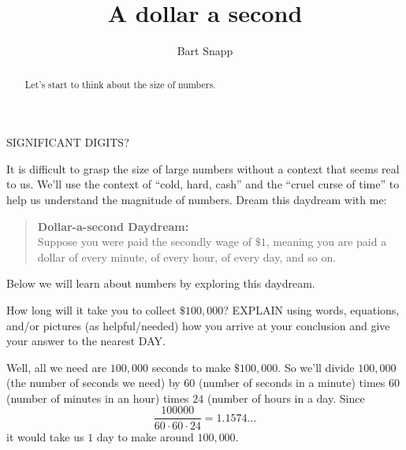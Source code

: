 \documentclass[nooutcomes,noauthor,hints]{ximera}
\title{A dollar a second}
\author{Bart Snapp}
\begin{document}
\begin{abstract}
  Let's start to think about the size of numbers.
\end{abstract}
\maketitle

\begin{listOutcomes}
\item SIGNIFICANT DIGITS?
\end{listOutcomes}


It is difficult to grasp the size of large numbers without a context
that seems real to us. We'll use the context of ``cold, hard, cash''
and the ``cruel curse of time'' to help us understand the magnitude of
numbers.  Dream this daydream with me:
\begin{mdframed}[style=OutcomeStyle]
  \begin{quote}
    \textbf{Dollar-a-second Daydream:}\\
  Suppose you were paid the secondly wage of $\$1$, meaning you are
  paid a dollar  of every minute, of every hour, of
  every day, and so on.
\end{quote}
\end{mdframed}
Below we will learn about numbers by exploring this daydream.



\mynewpage

\begin{question}
  How long will it take you to collect $\$100,000$? EXPLAIN using
  words, equations, and/or pictures (as helpful/needed) how you arrive
  at your conclusion and give your answer to the nearest DAY.
  \begin{freeResponse}
    Well, all we need are $100,000$ seconds to make $\$100,000$. So
    we'll divide $100,000$ (the number of seconds we need) by $60$
    (number of seconds in a minute) times $60$ (number of minutes in
    an hour) times $24$ (number of hours in a day.  Since
    \[
    \frac{100000}{60\cdot 60\cdot 24} = 1.1574\dots
    \]
    it would take us $1$ day to make around $100,000$.
  \end{freeResponse}
\end{question}
\mynewpage


\end{document}
